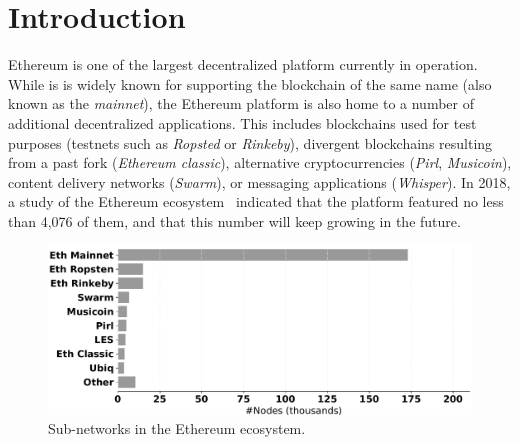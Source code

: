 
\section{Introduction}

Ethereum is one of  the largest decentralized platform currently in operation.
While is is widely known for supporting the blockchain of the same name (also known as the \emph{mainnet}), the Ethereum platform is also home to a number of additional decentralized applications.
This includes blockchains used for test purposes (testnets such as \emph{Ropsted} or \emph{Rinkeby}), divergent blockchains resulting from a past fork (\emph{Ethereum classic}), alternative cryptocurrencies (\emph{Pirl}, \emph{Musicoin}), content delivery networks (\emph{Swarm}), or messaging applications (\emph{Whisper}). 
In 2018, a study of the Ethereum ecosystem~\cite{kim2018measuring} indicated that the platform featured no less than 4,076 of them, and that this number will keep growing in the future. 

\begin{figure}[t]
    \includegraphics[width=1\linewidth]{img/ecosystem}
    \caption{Sub-networks in the Ethereum ecosystem.
    \protect{}}
    \label{fig:ecosystem}
\end{figure}

